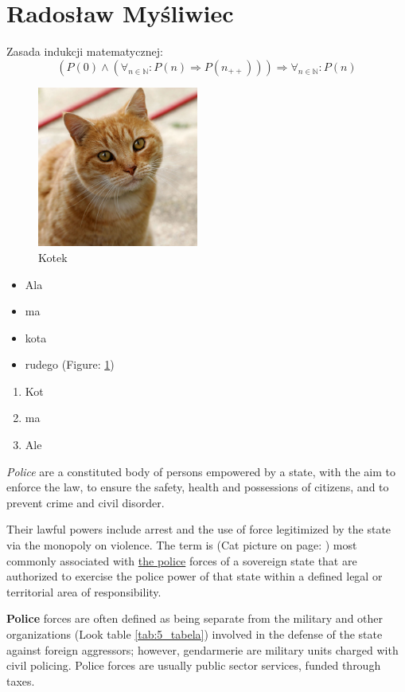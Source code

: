 \section {Radosław Myśliwiec}

Zasada indukcji matematycznej:
$$ (P(0) \land (\forall_{n \in \mathbb{N}} : P(n) \Rightarrow P(n_{++}))) 
\Rightarrow \forall_{n \in \mathbb{N}} : P(n) $$

\begin{figure} [htpb]
    \centering
    \includegraphics[width=200px]{pictures/cat.jpg}
    \caption{Kotek}
    \label{kot}
\end{figure}



\begin{itemize}
    \item Ala
    \item ma
    \item kota
    \item rudego (Figure: \ref{kot})
\end{itemize}

\begin{enumerate}
    \item Kot
    \item ma
    \item Ale
\end{enumerate}

\emph{Police} are a constituted body of persons empowered by a state, with the aim 
to enforce the law, to ensure the safety, health and possessions of citizens, 
and to prevent crime and civil disorder.

Their lawful powers include arrest and the use of force legitimized by the 
state via the monopoly on violence. The term is (Cat picture on page: \pageref{kot}) 
most commonly associated with 
\underline{the police} forces of a sovereign state that are authorized to exercise the police 
power of that state within a defined legal or territorial area of responsibility. 

\textbf{Police} forces are often defined as being separate from the military and 
other organizations (Look table \ref{tab:5_tabela}) involved in the defense of the 
state against foreign 
aggressors; however, gendarmerie are military units charged with civil policing. 
Police forces are usually public sector services, funded through taxes.
